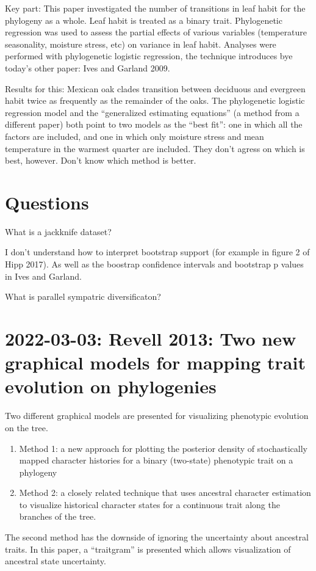 \documentclass{article}
\begin{document}
Key part: This paper investigated the number of transitions in leaf habit for
the phylogeny as a whole. Leaf habit is treated as a binary trait. Phylogenetic
regression was used to assess the partial effects of various variables
(temperature seasonality, moisture stress, etc) on variance in leaf habit.
Analyses were performed with phylogenetic logistic regression, the technique
introduces bye today's other paper: Ives and Garland 2009.

Results for this: Mexican oak clades transition between deciduous and evergreen
habit twice as frequently as the remainder of the oaks. The phylogenetic
logistic regression model and the ``generalized estimating equations'' (a method
from a different paper) both point to two models as the ``best fit'': one in
which all the factors are included, and one in which only moisture stress and
mean temperature in the warmest quarter are included. They don't agress on which
is best, however. Don't know which method is better.

\section{Questions} What is a jackknife dataset?

I don't understand how to interpret bootstrap support (for example in figure 2
of Hipp 2017). As well as the boostrap confidence intervals and bootstrap p
values in Ives and Garland. 

What is parallel sympatric diversificaton?


\section{2022-03-03: Revell 2013: Two new graphical models for mapping trait
  evolution on phylogenies}

Two different graphical models are presented for visualizing phenotypic
evolution on the tree.
\begin{enumerate}
\item Method 1: a new approach for plotting the posterior density of
  stochastically mapped character histories for a binary (two-state) phenotypic
  trait on a phylogeny
\item Method 2: a closely related technique that uses ancestral character
  estimation to visualize historical character states for a continuous trait
  along the branches of the tree.
\end{enumerate}
The second method has the downside of ignoring the uncertainty about ancestral
traits. In this paper, a ``traitgram'' is presented which allows visualization
of ancestral state uncertainty.
\end{document}
